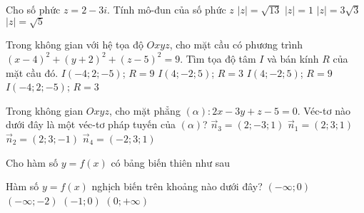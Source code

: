 \begin{ex}%
	Cho số phức $z=2-3i$. Tính mô-đun của số phức $z$
	\choice
	{\True $\vert z\vert=\sqrt{13}$}
	{$\vert z\vert=1$}
	{$\vert z\vert=3\sqrt{3}$}
	{$\vert z\vert=\sqrt{5}$}
\end{ex}


\begin{ex}%
	Trong không gian với hệ tọa độ $Oxyz$, cho mặt cầu có phương trình $(x-4)^2+(y+2)^2+(z-5)^2=9$. Tìm tọa độ tâm $I$ và bán kính $R$ của mặt cầu đó.
	\choice
	{$I(-4;2;-5)$; $R=9$}
	{\True $I(4;-2;5)$; $R=3$}
	{$I(4;-2;5)$; $R=9$}
	{$I(-4;2;-5)$; $R=3$}
\end{ex}


\begin{ex}%
	Trong không gian $Oxyz$, cho mặt phẳng $(\alpha) \colon 2x-3y+z-5=0$. Véc-tơ nào dưới đây là một véc-tơ pháp tuyến của $(\alpha)$?
	\choice
	{\True $\overrightarrow{n}_3=(2;-3;1)$}
	{$\overrightarrow{n}_1=(2;3;1)$}
	{$\overrightarrow{n}_2=(2;3;-1)$}
	{$\overrightarrow{n}_4=(-2;3;1)$}
\end{ex}


\begin{ex}%
	Cho hàm số $y=f(x)$ có bảng biến thiên như sau
	\begin{center}
	\end{center}
	Hàm số $y=f(x)$ nghịch biến trên khoảng nào dưới đây?
	\choice
	{$(-\infty;0)$}
	{\True $(-\infty;-2)$}
	{$(-1;0)$}
	{$(0;+\infty)$}
\end{ex}



